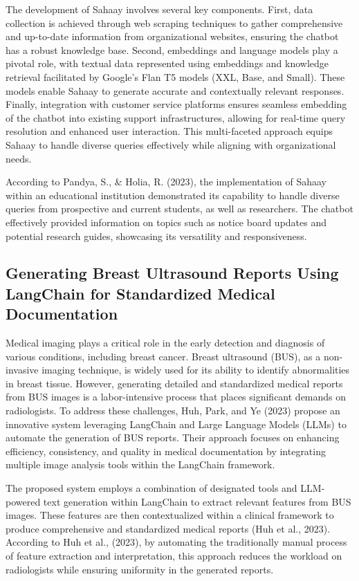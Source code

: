 The development of Sahaay involves several key components. First, data collection is achieved through web scraping techniques to gather comprehensive and up-to-date information from organizational websites, ensuring the chatbot has a robust knowledge base. Second, embeddings and language models play a pivotal role, with textual data represented using embeddings and knowledge retrieval facilitated by Google's Flan T5 models (XXL, Base, and Small). These models enable Sahaay to generate accurate and contextually relevant responses. Finally, integration with customer service platforms ensures seamless embedding of the chatbot into existing support infrastructures, allowing for real-time query resolution and enhanced user interaction. This multi-faceted approach equips Sahaay to handle diverse queries effectively while aligning with organizational needs.

According to Pandya, S., & Holia, R. (2023), the implementation of Sahaay within an educational institution demonstrated its capability to handle diverse queries from prospective and current students, as well as researchers. The chatbot effectively provided information on topics such as notice board updates and potential research guides, showcasing its versatility and responsiveness.


\subsection{Generating Breast Ultrasound Reports Using LangChain for Standardized Medical Documentation}

\noindent Medical imaging plays a critical role in the early detection and diagnosis of various conditions, including breast cancer. Breast ultrasound (BUS), as a non-invasive imaging technique, is widely used for its ability to identify abnormalities in breast tissue. However, generating detailed and standardized medical reports from BUS images is a labor-intensive process that places significant demands on radiologists. To address these challenges, Huh, Park, and Ye (2023) propose an innovative system leveraging LangChain and Large Language Models (LLMs) to automate the generation of BUS reports. Their approach focuses on enhancing efficiency, consistency, and quality in medical documentation by integrating multiple image analysis tools within the LangChain framework.

The proposed system employs a combination of designated tools and LLM-powered text generation within LangChain to extract relevant features from BUS images. These features are then contextualized within a clinical framework to produce comprehensive and standardized medical reports (Huh et al., 2023). According to Huh et al., (2023), by automating the traditionally manual process of feature extraction and interpretation, this approach reduces the workload on radiologists while ensuring uniformity in the generated reports.

